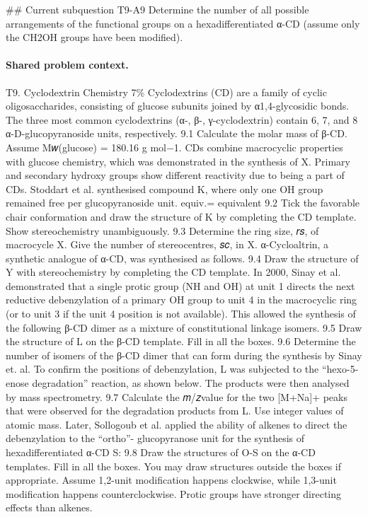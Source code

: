 \#\# Current subquestion T9-A9
Determine the number of all possible arrangements of the functional groups on a hexadifferentiated α-CD (assume only the CH2OH groups have been modified).

\paragraph{Shared problem context.}
T9. Cyclodextrin Chemistry 7\% Cyclodextrins (CD) are a family of cyclic oligosaccharides, consisting of glucose subunits joined by α1,4-glycosidic bonds. The three most common cyclodextrins (α-, β-, γ-cyclodextrin) contain 6, 7, and 8 α-D-glucopyranoside units, respectively. 9.1 Calculate the molar mass of β-CD. Assume M𝑤(glucose) = 180.16 g mol−1. CDs combine macrocyclic properties with glucose chemistry, which was demonstrated in the synthesis of X. Primary and secondary hydroxy groups show different reactivity due to being a part of CDs. Stoddart et al. synthesised compound K, where only one OH group remained free per glucopyranoside unit. equiv.= equivalent 9.2 Tick the favorable chair conformation and draw the structure of K by completing the CD template. Show stereochemistry unambiguously. 9.3 Determine the ring size, 𝑟𝑠, of macrocycle X. Give the number of stereocentres, 𝑠𝑐, in X. α-Cycloaltrin, a synthetic analogue of α-CD, was synthesised as follows. 9.4 Draw the structure of Y with stereochemistry by completing the CD template. In 2000, Sinay et al. demonstrated that a single protic group (NH and OH) at unit 1 directs the next reductive debenzylation of a primary OH group to unit 4 in the macrocyclic ring (or to unit 3 if the unit 4 position is not available). This allowed the synthesis of the following β-CD dimer as a mixture of constitutional linkage isomers. 9.5 Draw the structure of L on the β-CD template. Fill in all the boxes. 9.6 Determine the number of isomers of the β-CD dimer that can form during the synthesis by Sinay et. al. To confirm the positions of debenzylation, L was subjected to the “hexo-5-enose degradation” reaction, as shown below. The products were then analysed by mass spectrometry. 9.7 Calculate the 𝑚/𝑧value for the two [M+Na]+ peaks that were observed for the degradation products from L. Use integer values of atomic mass. Later, Sollogoub et al. applied the ability of alkenes to direct the debenzylation to the “ortho”- glucopyranose unit for the synthesis of hexadifferentiated α-CD S: 9.8 Draw the structures of O-S on the α-CD templates. Fill in all the boxes. You may draw structures outside the boxes if appropriate. Assume 1,2-unit modification happens clockwise, while 1,3-unit modification happens counterclockwise. Protic groups have stronger directing effects than alkenes.

